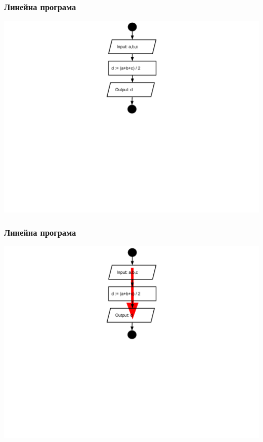 \documentclass{beamer}
\begin{document}
\begin{frame}[fragile]
\frametitle{Линейна програма}

\hspace*{-30pt}
\includegraphics[width=14cm]{images/fc_linear} 

\end{frame}


\begin{frame}[fragile]
\frametitle{Линейна програма}

\hspace*{-30pt}
\includegraphics[width=14cm]{images/fc_linear_arrows} 

\end{frame}
\end{document}
